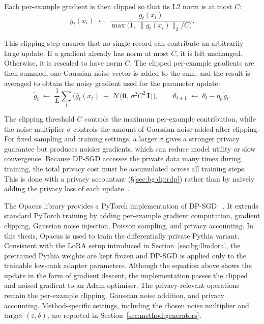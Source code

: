 Each per-example gradient is then clipped so that its L2 norm is at most $C$:
\begin{equation}
\label{eq:bg:dp:clip}
\bar{g}_t(x_i) \;\leftarrow\;
\frac{g_t(x_i)}
{\max\!\big(1,\; \lVert g_t(x_i) \rVert_2 / C\big)}.
\end{equation}

This clipping step ensures that no single record can contribute an arbitrarily
large update. If a gradient already has norm at most $C$, it is left unchanged.
Otherwise, it is rescaled to have norm $C$. The clipped per-example gradients 
are then summed, one Gaussian noise vector is
added to the sum, and the result is averaged to obtain the noisy gradient used
for the parameter update:
\begin{equation}
\label{eq:bg:dp:update}
\tilde{g}_t \;\leftarrow\; \frac{1}{L}\sum_{i}\!\big(\bar{g}_t(x_i)
   \;+\; \mathcal{N}\!\big(\mathbf{0},\, \sigma^{2} C^{2}\,\mathbf{I}\big)\big),
\qquad
\theta_{t+1} \;\leftarrow\; \theta_t - \eta_t\,\tilde{g}_t.
\end{equation}


The clipping threshold $C$ controls the maximum per-example contribution, while
the noise multiplier $\sigma$ controls the amount of Gaussian noise added after
clipping. For fixed sampling and training settings, a larger $\sigma$ gives a
stronger privacy guarantee but produces noisier gradients, which can reduce
model utility or slow convergence. Because DP-SGD accesses the private data
many times during training, the total privacy cost must be accumulated across
all training steps. This is done with a privacy accountant (§\ref{sec:bg:dp:rdp}) rather than by
naively adding the privacy loss of each update~\cite{Abadi2016DPSGD}.

The Opacus library provides a PyTorch implementation of DP-SGD
~\cite{Yousefpour2021Opacus}. It extends standard PyTorch training by adding
per-example gradient computation, gradient clipping, Gaussian noise injection,
Poisson sampling, and privacy accounting. In this thesis, Opacus is used to
train the differentially private Pythia variant. Consistent with the LoRA setup
introduced in Section~\ref{sec:bg:llm:lora}, the pretrained Pythia weights are
kept frozen and DP-SGD is applied only to the trainable low-rank adapter
parameters. Although the equation above shows the update in the form of
gradient descent, the implementation passes the clipped and noised gradient to
an Adam optimiser. The privacy-relevant operations remain the per-example
clipping, Gaussian noise addition, and privacy accounting. Method-specific
settings, including the chosen noise multiplier and target
$(\varepsilon,\delta)$, are reported in Section~\ref{sec:method:generators}.


